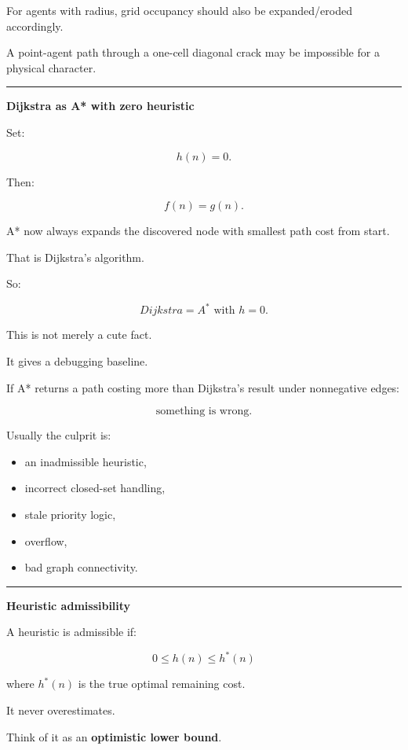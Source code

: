For agents with radius, grid occupancy should also be expanded/eroded accordingly.

A point-agent path through a one-cell diagonal crack may be impossible for a physical character.

\begin{center}\rule{0.5\linewidth}{0.5pt}\end{center}

\textbf{Dijkstra as A* with zero heuristic}

Set:

\[
h(n)=0.
\]

Then:

\[
f(n)=g(n).
\]

A* now always expands the discovered node with smallest path cost from start.

That is Dijkstra's algorithm.

So:

\[
\boxed{
Dijkstra
=
A^*\text{ with }h=0.
}
\]

This is not merely a cute fact.

It gives a debugging baseline.

If A* returns a path costing more than Dijkstra's result under nonnegative edges:

\[
\text{something is wrong}.
\]

Usually the culprit is:

\begin{itemize}
\tightlist
\item
  an inadmissible heuristic,
\item
  incorrect closed-set handling,
\item
  stale priority logic,
\item
  overflow,
\item
  bad graph connectivity.
\end{itemize}

\begin{center}\rule{0.5\linewidth}{0.5pt}\end{center}

\textbf{Heuristic admissibility}

A heuristic is admissible if:

\[
\boxed{
0\le h(n)\le h^*(n)
}
\]

where \(h^*(n)\) is the true optimal remaining cost.

It never overestimates.

Think of it as an \textbf{optimistic lower bound}.

